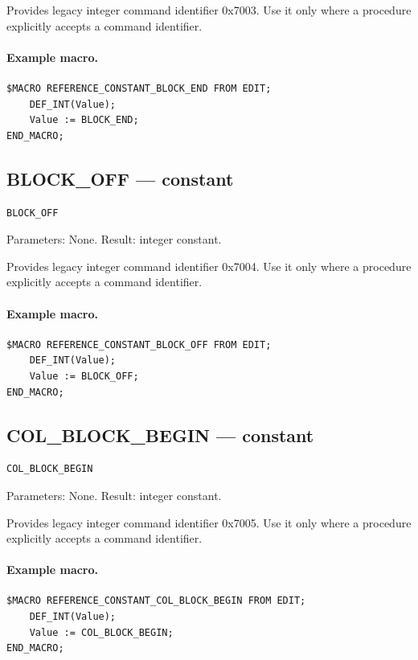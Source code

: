 \documentclass[a4paper,10pt,twoside,openany]{book}
\begin{document}
Provides legacy integer command identifier 0x7003. Use it only where a procedure explicitly accepts a command identifier.

\paragraph{Example macro.}
\begin{verbatim}
$MACRO REFERENCE_CONSTANT_BLOCK_END FROM EDIT;
    DEF_INT(Value);
    Value := BLOCK_END;
END_MACRO;
\end{verbatim}

\label{prim:constant-block-off}
\subsection*{BLOCK\_OFF --- constant}
\begin{verbatim}
BLOCK_OFF
\end{verbatim}
Parameters: None. Result: integer constant.

Provides legacy integer command identifier 0x7004. Use it only where a procedure explicitly accepts a command identifier.

\paragraph{Example macro.}
\begin{verbatim}
$MACRO REFERENCE_CONSTANT_BLOCK_OFF FROM EDIT;
    DEF_INT(Value);
    Value := BLOCK_OFF;
END_MACRO;
\end{verbatim}

\label{prim:constant-col-block-begin}
\subsection*{COL\_BLOCK\_BEGIN --- constant}
\begin{verbatim}
COL_BLOCK_BEGIN
\end{verbatim}
Parameters: None. Result: integer constant.

Provides legacy integer command identifier 0x7005. Use it only where a procedure explicitly accepts a command identifier.

\paragraph{Example macro.}
\begin{verbatim}
$MACRO REFERENCE_CONSTANT_COL_BLOCK_BEGIN FROM EDIT;
    DEF_INT(Value);
    Value := COL_BLOCK_BEGIN;
END_MACRO;
\end{verbatim}
\end{document}
